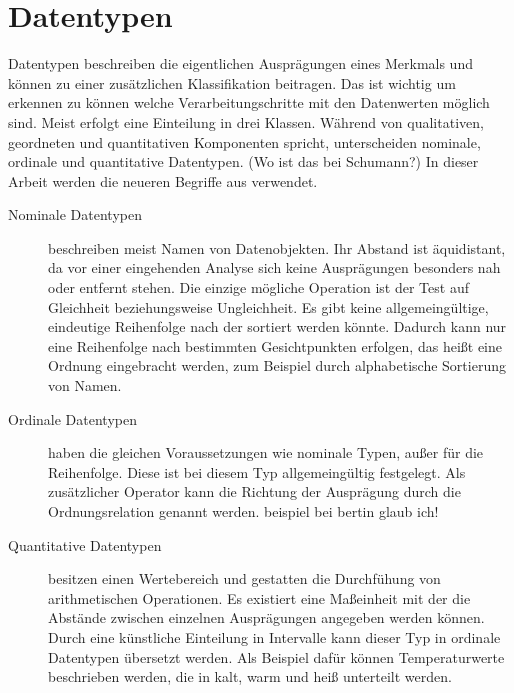 \documentclass[a4paper, 12pt, DIVcalc, onepage, pdftex, headsepline, footsepline]{scrreprt}
\begin{document}
\section{Datentypen}
\label{sec:Datentypen}
Datentypen beschreiben die eigentlichen Ausprägungen eines Merkmals und können zu einer zusätzlichen
Klassifikation beitragen. Das ist wichtig um erkennen zu können welche Verarbeitungschritte mit den Datenwerten
möglich sind. Meist erfolgt eine Einteilung in drei Klassen. Während \citep{Bertin} von qualitativen,
geordneten und quantitativen Komponenten spricht, unterscheiden \citep{Preim} nominale, ordinale und
quantitative Datentypen. (Wo ist das bei Schumann?)
In dieser Arbeit werden die neueren Begriffe aus \citep{Preim} verwendet.
\begin{description}
\item[Nominale Datentypen]
beschreiben meist Namen von Datenobjekten. Ihr Abstand ist äquidistant, da vor einer eingehenden Analyse sich
keine Ausprägungen besonders nah oder entfernt stehen. Die einzige mögliche Operation ist der Test auf
Gleichheit beziehungsweise Ungleichheit. Es gibt keine allgemeingültige, eindeutige Reihenfolge
nach der sortiert werden könnte. Dadurch kann nur eine Reihenfolge nach bestimmten Gesichtpunkten erfolgen,
das heißt eine Ordnung eingebracht werden, zum Beispiel durch alphabetische Sortierung von Namen.
\item[Ordinale Datentypen]
haben die gleichen Voraussetzungen wie nominale Typen, außer für die Reihenfolge.
Diese ist bei diesem Typ allgemeingültig festgelegt. Als zusätzlicher Operator kann die Richtung der
Ausprägung durch die Ordnungsrelation genannt werden.
beispiel bei bertin glaub ich!
\item[Quantitative Datentypen] besitzen einen Wertebereich und gestatten die Durchfühung von arithmetischen Operationen. Es existiert eine
Maßeinheit mit der die Abstände zwischen einzelnen Ausprägungen angegeben werden können. Durch eine 
künstliche Einteilung in Intervalle kann dieser Typ in ordinale Datentypen übersetzt werden. Als Beispiel
dafür können Temperaturwerte beschrieben werden, die in kalt, warm und heiß unterteilt werden.
\end{description}
\end{document}
